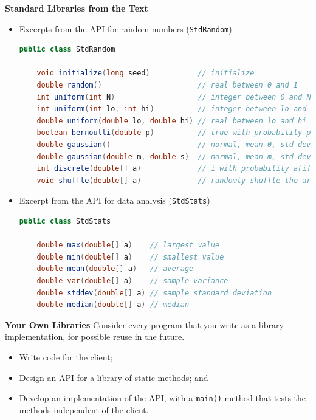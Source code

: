 \documentclass[8pt,a4paper,compress]{beamer}
\begin{document}
\begin{frame}[fragile]
\pause

\textbf{Standard Libraries from the Text}
\begin{itemize}
\item Excerpts from the API for random numbers (\lstinline$StdRandom$)
\begin{lstlisting}[language=Java]
public class StdRandom

    void initialize(long seed)           // initialize
    double random()                      // real between 0 and 1
    int uniform(int N)                   // integer between 0 and N-1
    int uniform(int lo, int hi)          // integer between lo and hi-1
    double uniform(double lo, double hi) // real between lo and hi
    boolean bernoulli(double p)          // true with probability p
    double gaussian()                    // normal, mean 0, std dev 1
    double gaussian(double m, double s)  // normal, mean m, std dev s
    int discrete(double[] a)             // i with probability a[i]
    void shuffle(double[] a)             // randomly shuffle the array a[]
\end{lstlisting}

\item Excerpt from the API for data analysis (\lstinline$StdStats$)
\begin{lstlisting}[language=Java]
public class StdStats

    double max(double[] a)    // largest value
    double min(double[] a)    // smallest value
    double mean(double[] a)   // average
    double var(double[] a)    // sample variance
    double stddev(double[] a) // sample standard deviation
    double median(double[] a) // median
\end{lstlisting}
\end{itemize}

\pause
\smallskip

\textbf{Your Own Libraries} Consider every program that you write as a library implementation, for possible reuse in the future.
\begin{itemize}
\item Write code for the client; 
\item Design an API for a library of static methods; and
\item Develop an implementation of the API, with a \lstinline$main()$ method that tests the methods independent of the client.
\end{itemize}
\end{frame}
\end{document}
